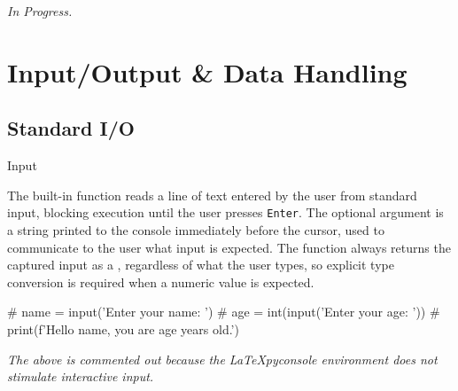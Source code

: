 \documentclass[10pt]{article}
\begin{document}
    \textit{In Progress.}

\section{Input/Output \& Data Handling}

  \subsection{Standard I/O}

    \begin{core}{Input}

      The built-in  function reads a line of text entered by the user from standard input, blocking execution until the user presses \texttt{Enter}. The optional  argument is a string printed to the console immediately before the cursor, used to communicate to the user what input is expected. The function always returns the captured input as a , regardless of what the user types, so explicit type conversion is required when a numeric value is expected.

      \begin{pyconsole}

        # name = input('Enter your name: ')
        # age = int(input('Enter your age: '))
        # print(f'Hello {name}, you are {age} years old.')

      \end{pyconsole}

      \textit{The above is commented out because the \LaTeX pyconsole environment does not stimulate interactive input.}

    \end{core}
\end{document}
